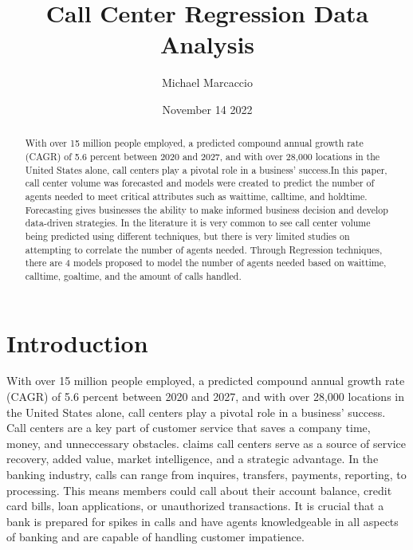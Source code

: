 \documentclass[12pt]{article}
\title{Call Center Regression Data Analysis}
\author{Michael Marcaccio}
\date{November 14 2022}
\begin{document}
\maketitle

\begin{abstract}
 With over 15 million people employed, a predicted compound annual growth rate (CAGR) of 5.6 percent between 2020 and 2027, and with over 28,000 locations
 in the United States alone, call centers play a pivotal role in a business' success.In this paper, call center volume was forecasted and
 models were created to predict the number of agents needed to meet critical attributes such as waittime, calltime, and holdtime. 
 Forecasting gives businesses the ability to make informed business decision and develop data-driven strategies. In the literature it is very
 common to see call center volume being predicted using different techniques, but there is very limited studies on attempting to correlate
 the number of agents needed. Through Regression techniques, there are 4 models proposed to model the number of agents needed based on waittime,
 calltime, goaltime, and the amount of calls handled.
\end{abstract}

\section*{Introduction}
  With over 15 million people employed, a predicted compound annual growth rate (CAGR) of 5.6 percent between 2020 and 2027, and with over 28,000 locations
in the United States alone, call centers play a pivotal role in a business' success. Call centers are a key part of customer service
that saves a company time, money, and unneccessary obstacles. \citep{feinberg2002operational} claims call centers serve as a source of service recovery, added value, market intelligence, and a strategic advantage.
In the banking industry, calls can range from inquires, transfers, payments, reporting, to processing. This means members could call about their account balance, credit card bills, loan applications, 
or unauthorized transactions. It is crucial that a bank is prepared for spikes in calls and have agents knowledgeable in all aspects of banking and are capable of handling customer impatience. \citep{brown2005statistical} 
\end{document}
